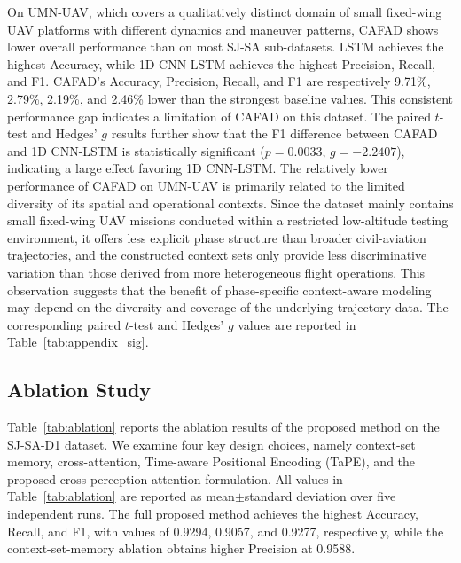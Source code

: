 \documentclass[iicol,pdflatex,sn-basic,Numbered]{sn-jnl}%
\theoremstyle{thmstyleone}%
\theoremstyle{thmstyletwo}%
\theoremstyle{thmstylethree}%
\begin{document}
On UMN-UAV, which covers a qualitatively distinct domain of small fixed-wing UAV platforms with different dynamics and maneuver patterns, CAFAD shows lower overall performance than on most SJ-SA sub-datasets.
LSTM achieves the highest Accuracy, while 1D CNN-LSTM achieves the highest Precision, Recall, and F1.
CAFAD's Accuracy, Precision, Recall, and F1 are respectively 9.71\%, 2.79\%, 2.19\%, and 2.46\% lower than the strongest baseline values.
This consistent performance gap indicates a limitation of CAFAD on this dataset.
The paired $t$-test and Hedges' $g$ results further show that the F1 difference between CAFAD and 1D CNN-LSTM is statistically significant ($p=0.0033$, $g=-2.2407$), indicating a large effect favoring 1D CNN-LSTM.
The relatively lower performance of CAFAD on UMN-UAV is primarily related to the limited diversity of its spatial and operational contexts.
Since the dataset mainly contains small fixed-wing UAV missions conducted within a restricted low-altitude testing environment, it offers less explicit phase structure than broader civil-aviation trajectories, and the constructed context sets only provide less discriminative variation than those derived from more heterogeneous flight operations.
This observation suggests that the benefit of phase-specific context-aware modeling may depend on the diversity and coverage of the underlying trajectory data.
The corresponding paired $t$-test and Hedges' $g$ values are reported in Table~\ref{tab:appendix_sig}.


\subsection{Ablation Study}
\label{sec:ablation}

Table~\ref{tab:ablation} reports the ablation results of the proposed method on the SJ-SA-D1 dataset.
We examine four key design choices, namely context-set memory, cross-attention, Time-aware Positional Encoding (TaPE), and the proposed cross-perception attention formulation.
All values in Table~\ref{tab:ablation} are reported as mean$\pm$standard deviation over five independent runs.
The full proposed method achieves the highest Accuracy, Recall, and F1, with values of 0.9294, 0.9057, and 0.9277, respectively, while the context-set-memory ablation obtains higher Precision at 0.9588.
\end{document}
